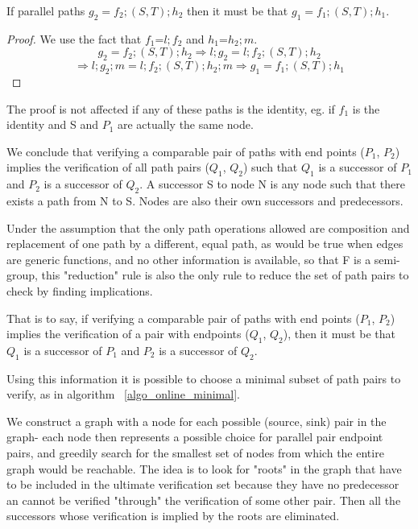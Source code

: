 \documentclass[sigplan,review,anonymous]{acmart}
\begin{document}
{\begin{theorem}
\label{reductionRule}
If parallel paths $g_2 = f_2; (S,T); h_2$ then it must be that $g_1 = f_1; (S,T); h_1$.
\end{theorem} 
\begin{proof}
We use the fact that $f_1$=$l; f_2$ and $h_1$=$h_2; m$.
\[g_2 = f_2; (S,T); h_2 \Rightarrow l; g_2 = l; f_2; (S,T) ; h_2 \]
\[\Rightarrow l ; g_2 ; m = l ; f_2 ; (S,T) ; h_2 ; m \Rightarrow g_1 = f_1 ; (S,T) ; h_1\]
\end{proof}

The proof is not affected if any of these paths is the identity, eg. if $f_1$ is the identity and S and $P_1$ are actually the same node.

We conclude that verifying a comparable pair of paths with end points ($P_1$, $P_2$) implies the verification of all path pairs ($Q_1$, $Q_2$) such that $Q_1$ is a successor of $P_1$ and $P_2$ is a successor of $Q_2$. A successor S to node N is any node such that there exists a path from N to S. Nodes are also their own successors and predecessors.

Under the assumption that the only path operations allowed are composition and replacement of one path by a different, equal path, as would be true when edges are generic functions, and no other information is available, so that F is a semi-group, this "reduction" rule is also the only rule to reduce the set of path pairs to check by finding implications.

That is to say, if verifying a comparable pair of paths with end points ($P_1$, $P_2$) implies the verification of a pair with endpoints ($Q_1$, $Q_2$), then it must be that $Q_1$ is a successor of $P_1$ and $P_2$ is a successor of $Q_2$. %

Using this information it is possible to choose a minimal subset of path pairs to verify, as in algorithm ~\ref{algo_online_minimal}.

We construct a graph with a node for each possible (source, sink) pair in the graph- each node then represents a possible choice for parallel pair endpoint pairs, and greedily search for the smallest set of nodes from which the entire graph would be reachable. The idea is to look for "roots" in the graph that have to be included in the ultimate verification set because they have no predecessor an cannot be verified "through" the verification of some other pair. Then all the successors whose verification is implied by the roots are eliminated.

}
\end{document}
